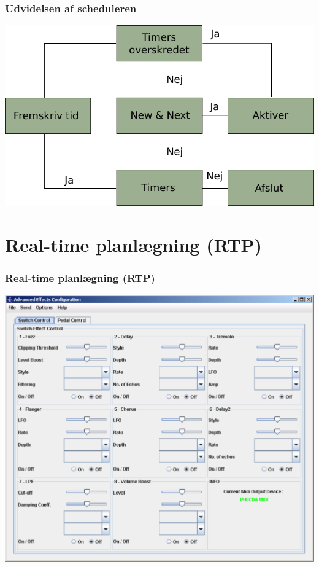 \documentclass[12pt]{beamer}
\begin{document}
 
\begin{frame}
\frametitle{Udvidelsen af scheduleren}
\includegraphics[scale=0.9]{des-scheduler} 
\end{frame}


\section{Real-time planlægning (RTP)}
\begin{frame}
  \frametitle{Real-time planlægning (RTP)}
\begin{center}
\includegraphics[scale=0.35]{gui_screenshot.pdf} 
\end{center}
\end{frame}
\end{document}
